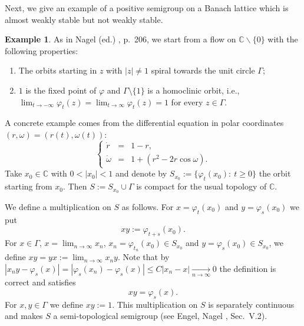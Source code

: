\documentclass[11pt,intlimits, draft,oneside]{amsart}
\theoremstyle{definition}
\newtheorem{example}[thm]{Example}
\def\CC{\mathbb{C}}
\begin{document}
Next, we give an example of a positive semigroup on a Banach lattice
which is almost weakly stable but not weakly stable.


\begin{example} \label{fluss}
As in Nagel (ed.) \cite{nagel:1986}, p.~206, we start from a flow on
$\CC \backslash \{0\}$ with the following properties:
%
\begin{enumerate}[1)]
\item The orbits starting in $z$ with $|z|\neq 1$ spiral towards the unit circle $\Gamma$;
\item $1$ is the fixed point of $\varphi$ and $\Gamma \setminus \{1\}$ is a homoclinic orbit, i.e., $\displaystyle \lim_{t\to -\infty}\varphi_t(z) = \displaystyle \lim_{t\to \infty}\varphi_t(z) =1$ for every $z\in \Gamma$.
\end{enumerate}
A concrete example comes from the differential equation in polar
coordinates $(r,\omega)=(r(t), \omega(t))$:
\begin{equation*}\left\{
\begin{array}{rcl}
\dot{r}&=&1-r, \\
\dot{\omega}&=& 1+(r^2 - 2r \cos\omega).
\end{array}\right.
\end{equation*}
%
Take $x_0\in \CC$ with $0<|x_0|<1$ and denote by
$S_{x_0}:=\{\varphi_t(x_0):\:t\geq 0\}$ the orbit starting from
$x_0$. Then $S:=S_{x_0}\cup \Gamma$ is compact for the usual
topology of $\CC$.

\smallskip We define a multiplication on $S$ as follows. For
$x=\varphi_t(x_0)$ and $y=\varphi_s(x_0)$ we put
%
\begin{equation*}
x y := \varphi_{t+s}(x_0).
\end{equation*}
For $x\in \Gamma$, $x=\lim_{n\to\infty} x_n$,
$x_n=\varphi_{t_n}(x_0)\in S_{x_0}$ and $y=\varphi_s(x_0)\in
S_{x_0}$, we define $x y =y x := \lim_{n\to\infty} x_n y$.
%
Note that by $|x_n y - \varphi_s(x)|=|\varphi_s
(x_n)-\varphi_s(x)|\leq C |x_n - x| \underset{n\to
\infty}{\longrightarrow} 0$ the definition is correct and satisfies
%
\begin{equation*}
x y = \varphi_s(x).
\end{equation*}
%
For $x,y\in \Gamma$ we define $xy:=1$. This multiplication on $S$ is
separately continuous and makes $S$ a semi-topological semigroup
(see Engel, Nagel \cite{engel/nagel:2000}, Sec.~V.2).


\end{example}
\end{document}
